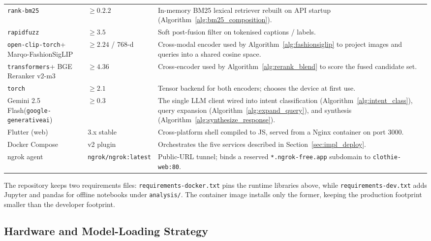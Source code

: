 \begin{table}[H]
\begin{tabular}{>{\raggedright\arraybackslash}p{4.0cm} >{\raggedright\arraybackslash}p{3.0cm} >{\raggedright\arraybackslash}p{7.0cm}}
\texttt{rank-bm25} & $\geq 0.2.2$ & In-memory BM25 lexical retriever rebuilt on API startup (Algorithm~\ref{alg:bm25_composition}). \\
\texttt{rapidfuzz} & $\geq 3.5$ & Soft post-fusion filter on tokenised captions / labels. \\
\texttt{open-clip-torch}\newline + Marqo-FashionSigLIP & $\geq 2.24$ / 768-d & Cross-modal encoder used by Algorithm~\ref{alg:fashionsiglip} to project images and queries into a shared cosine space. \\
\texttt{transformers}\newline + BGE Reranker v2-m3 & $\geq 4.36$ & Cross-encoder used by Algorithm~\ref{alg:rerank_blend} to score the fused candidate set. \\
\texttt{torch} & $\geq 2.1$ & Tensor backend for both encoders; chooses the device at first use. \\
Gemini 2.5 Flash\newline(\texttt{google-generativeai}) & $\geq 0.3$ & The single LLM client wired into intent classification (Algorithm~\ref{alg:intent_class}), query expansion (Algorithm~\ref{alg:expand_query}), and synthesis (Algorithm~\ref{alg:synthesize_response}). \\
Flutter (web) & 3.x stable & Cross-platform shell compiled to JS, served from a Nginx container on port 3000. \\
Docker Compose & v2 plugin & Orchestrates the five services described in Section~\ref{sec:impl_deploy}. \\
ngrok agent & \texttt{ngrok/ngrok:}\newline\texttt{latest} & Public-URL tunnel; binds a reserved \texttt{*.ngrok-free.app} subdomain to \texttt{clothie-web:80}. \\
\bottomrule
\end{tabular}
\end{table}

The repository keeps two requirements files: \texttt{requirements-docker.txt} pins the runtime libraries above, while \texttt{requirements-dev.txt} adds Jupyter and pandas for offline notebooks under \texttt{analysis/}. The container image installs only the former, keeping the production footprint smaller than the developer footprint.

\subsection{Hardware and Model-Loading Strategy}

